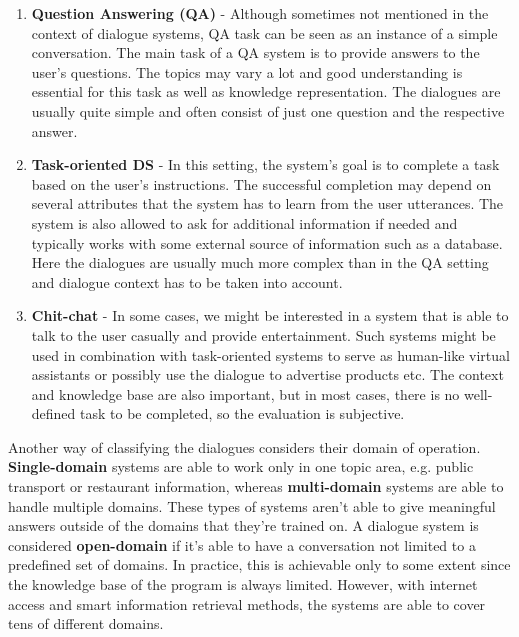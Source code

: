 \begin{enumerate}
    \item \textbf{Question Answering (QA)} - Although sometimes not mentioned in the context of dialogue systems, QA task can be seen as an instance of a simple conversation. The main task of a QA system is to provide answers to the user's questions.
    The topics may vary a lot and good understanding is essential for this task as well as knowledge representation.
    The dialogues are usually quite simple and often consist of just one question and the respective answer.
    \item \textbf{Task-oriented DS} - In this setting, the system's goal is to complete a task based on the user's instructions.
    The successful completion may depend on several attributes that the system has to learn from the user utterances.
    The system is also allowed to ask for additional information if needed and typically works with some external source of information such as a database.
    Here the dialogues are usually much more complex than in the QA setting and dialogue context has to be taken into account.
    \item \textbf{Chit-chat} - In some cases, we might be interested in a system that is able to talk to the user casually and provide entertainment.
    Such systems might be used in combination with task-oriented systems to serve as human-like virtual assistants or possibly use the dialogue to advertise products etc.
    The context and knowledge base are also important, but in most cases, there is no well-defined task to be completed, so the evaluation is subjective.
\end{enumerate}

Another way of classifying the dialogues considers their domain of operation.
\textbf{Single-domain} systems are able to work only in one topic area, e.g. public transport or restaurant information, whereas \textbf{multi-domain} systems are able to handle multiple domains.
These types of systems aren't able to give meaningful answers outside of the domains that they're trained on.
A dialogue system is considered \textbf{open-domain} if it's able to have a conversation not limited to a predefined set of domains.
In practice, this is achievable only to some extent since the knowledge base of the program is always limited.
However, with internet access and smart information retrieval methods, the systems are able to cover tens of different domains.


